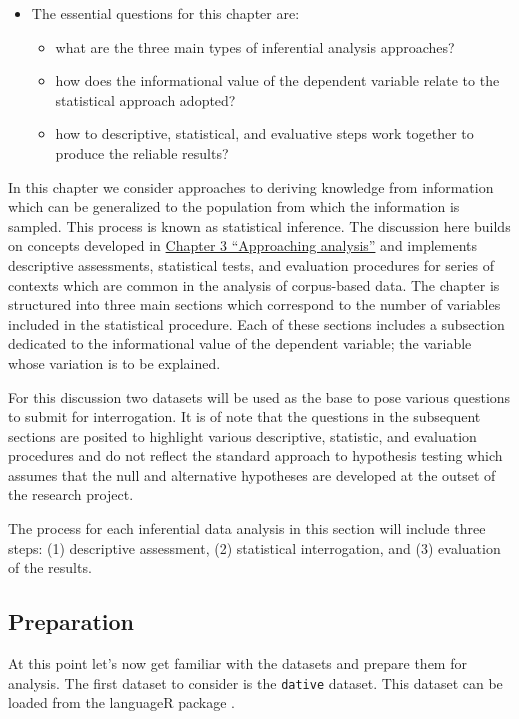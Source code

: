 \documentclass[
]{article}
\providecommand{\tightlist}{%
  \setlength{\itemsep}{0pt}\setlength{\parskip}{0pt}}
\newenvironment{rmdblock}[1]
  {\begin{shaded*}
  \begin{itemize}
  \renewcommand{\labelitemi}{
    \raisebox{-.5\height}[0pt][0pt]{
      {\setkeys{Gin}{width=2em,keepaspectratio}\texttt{[image: assets/images/\#1]}}
    }
  }
  \item
  }
  {
  \end{itemize}
  \end{shaded*}
  }
\newenvironment{rmdkey}
  {\begin{rmdblock}{key}}
  {\end{rmdblock}}
\begin{document}
\begin{rmdkey}
The essential questions for this chapter are:

\begin{itemize}
\tightlist
\item
  what are the three main types of inferential analysis approaches?
\item
  how does the informational value of the dependent variable relate to
  the statistical approach adopted?
\item
  how to descriptive, statistical, and evaluative steps work together to
  produce the reliable results?
\end{itemize}
\end{rmdkey}

In this chapter we consider approaches to deriving knowledge from information which can be generalized to the population from which the information is sampled. This process is known as statistical inference. The discussion here builds on concepts developed in \protect\hyperlink{approaching-analysis}{Chapter 3 ``Approaching analysis''} and implements descriptive assessments, statistical tests, and evaluation procedures for series of contexts which are common in the analysis of corpus-based data. The chapter is structured into three main sections which correspond to the number of variables included in the statistical procedure. Each of these sections includes a subsection dedicated to the informational value of the dependent variable; the variable whose variation is to be explained.

For this discussion two datasets will be used as the base to pose various questions to submit for interrogation. It is of note that the questions in the subsequent sections are posited to highlight various descriptive, statistic, and evaluation procedures and do not reflect the standard approach to hypothesis testing which assumes that the null and alternative hypotheses are developed at the outset of the research project.

The process for each inferential data analysis in this section will include three steps: (1) descriptive assessment, (2) statistical interrogation, and (3) evaluation of the results.

\hypertarget{preparation}{%
\subsection{Preparation}\label{preparation}}

At this point let's now get familiar with the datasets and prepare them for analysis. The first dataset to consider is the \texttt{dative} dataset. This dataset can be loaded from the languageR package \citep{R-languageR}.
\end{document}
